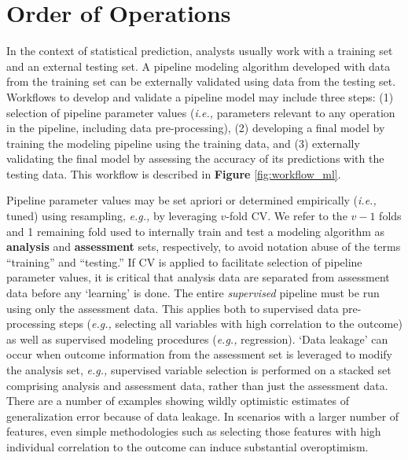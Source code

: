 \documentclass[AMA,STIX1COL,doublespace]{WileyNJD-v2}
\begin{document}
\section{Order of Operations} \label{sec:oop}

In the context of statistical prediction, analysts usually work with a
training set and an external testing set. A pipeline modeling algorithm
developed with data from the training set can be externally validated
using data from the testing set. Workflows to develop and validate a
pipeline model may include three steps: (1) selection of pipeline
parameter values (\textit{i.e., }parameters relevant to any operation in
the pipeline, including data pre-processing), (2) developing a final
model by training the modeling pipeline using the training data, and (3)
externally validating the final model by assessing the accuracy of its
predictions with the testing data. This workflow is described in
\textbf{Figure} \ref{fig:workflow_ml}.

Pipeline parameter values may be set apriori or determined empirically
(\textit{i.e., }tuned) using resampling, \textit{e.g., }by leveraging
\(v\)-fold CV. We refer to the \(v-1\) folds and 1 remaining fold used
to internally train and test a modeling algorithm as \textbf{analysis}
and \textbf{assessment} sets, respectively, to avoid notation abuse of
the terms ``training'' and ``testing.'' \cite{breiman} If CV is applied
to facilitate selection of pipeline parameter values, it is critical
that analysis data are separated from assessment data before any
`learning' is done. The entire \emph{supervised} pipeline must be run
using only the assessment data. This applies both to supervised data
pre-processing steps (\textit{e.g., }selecting all variables with high
correlation to the outcome) as well as supervised modeling procedures
(\textit{e.g., }regression). `Data leakage' can occur when outcome
information from the assessment set is leveraged to modify the analysis
set, \textit{e.g., }supervised variable selection is performed on a
stacked set comprising analysis and assessment data, rather than just
the assessment data.\cite{hastie2009elements} There are a number of
examples showing wildly optimistic estimates of generalization error
because of data leakage.\cite{neunhoeffer2019cross} In scenarios with a
larger number of features, even simple methodologies such as selecting
those features with high individual correlation to the outcome can
induce substantial overoptimism.
\end{document}
